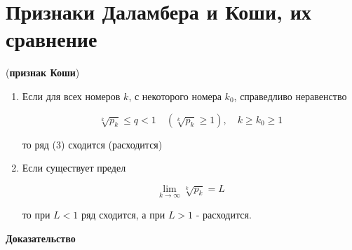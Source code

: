 \section{Признаки Даламбера и Коши, их сравнение}

\begin{theorem}
	(\textbf{признак Коши}) \begin{enumerate}
		\item Если для всех номеров $k$, с некоторого номера $k_0$, справедливо неравенство
		
		\begin{equation}
			\sqrt[k]{p_k} \leqslant q < 1\quad (\sqrt[k]{p_k} \geqslant 1),\quad k \geqslant k_0 \geqslant 1
		\end{equation}
		
		то ряд (3) сходится (расходится)
		
		\item Если существует предел
		
		\begin{equation}
			\displaystyle\lim_{k\rightarrow \infty} \sqrt[k]{p_k} = L
		\end{equation}
		
		то при $L < 1$ ряд сходится, а при $L > 1$ - расходится.
	\end{enumerate}
\end{theorem}

\textbf{Доказательство}

